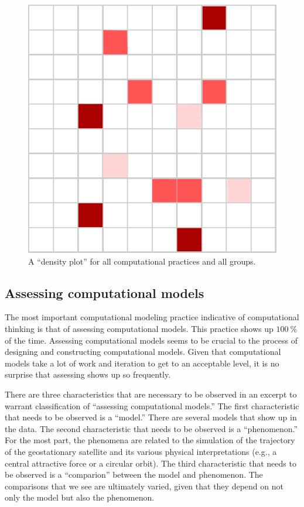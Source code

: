\documentclass{msuphddissertation}
\begin{document}
\begin{doublespace}
\begin{figure}[ht]\centering
\includegraphics[scale=1]{./images/matrix.pdf}
\caption{A ``density plot'' for all computational practices and all groups.}
\end{figure}

\subsection{Assessing computational models}

The most important computational modeling practice indicative of computational thinking is that of assessing computational models.  This practice shows up $\SI{100}{\percent}$ of the time.  Assessing computational models seems to be crucial to the process of designing and constructing computational models.  Given that computational models take a lot of work and iteration to get to an acceptable level, it is no surprise that assessing shows up so frequently.

There are three characteristics that are necessary to be observed in an excerpt to warrant classification of ``assessing computational models.''  The first characteristic that needs to be observed is a ``model.''  There are several models that show up in the data.  The second characteristic that needs to be observed is a ``phenomenon.''  For the most part, the phenomena are related to the simulation of the trajectory of the geostationary satellite and its various physical interpretations (e.g., a central attractive force or a circular orbit).  The third characteristic that needs to be observed is a ``comparion'' between the model and phenomenon.  The comparisons that we see are ultimately varied, given that they depend on not only the model but also the phenomenon.


\end{doublespace}
\end{document}
